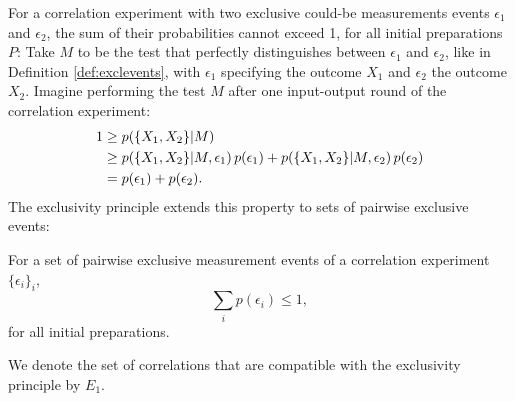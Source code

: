 For a correlation experiment with two exclusive could-be measurements events $\epsilon_1$ and $\epsilon_2$, the sum of their probabilities cannot exceed 1, for all initial preparations $P$: Take $M$ to be the test that perfectly distinguishes between $\epsilon_1$ and $\epsilon_2$, like in Definition \ref{def:exclevents}, with $\epsilon_1$ specifying the outcome $X_1$ and $\epsilon_2$ the outcome $X_2$. Imagine performing the test $M$ after one input-output round of the correlation experiment: 
\begin{align*}
1 & \geq p(\{X_1,X_2\}\vert M) \\
& \geq p(\{X_1,X_2\}\vert M, \epsilon_1)\thinspace p(\epsilon_1) + p(\{X_1,X_2\}\vert M, \epsilon_2)\thinspace p(\epsilon_2)\\
& = p(\epsilon_1)+p(\epsilon_2).
\end{align*}
The exclusivity principle extends this property to sets of pairwise exclusive events:

\begin{principle}\hfill\break
For a set of pairwise exclusive measurement events of a correlation experiment $\{\epsilon_i\}_i$,
\begin{equation*}
    \sum_i p(\epsilon_i)\leq 1,
\end{equation*}
for all initial preparations.
\end{principle}

We denote the set of correlations that are compatible with the exclusivity principle by $E_1$.

